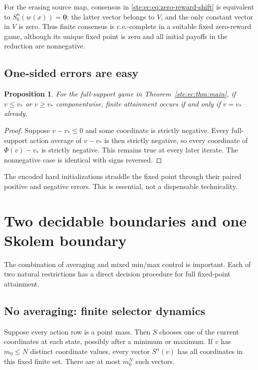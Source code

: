 \documentclass[11pt,letterpaper]{article}
\newtheorem{proposition}[theorem]{Proposition}
\theoremstyle{definition}
\theoremstyle{remark}
\newcommand{\zero}{\mathbf 0}
\begin{document}
For the erasing source map, consensus in
\eqref{ste:ec:eq:zero-reward-shift} is equivalent to
$S_0^n(w(x))=\zero$: the latter vector belongs to $V$, and the only
constant vector in $V$ is zero. Thus finite consensus is c.e.-complete in
a suitable fixed zero-reward game, although its unique fixed point is zero
and all initial payoffs in the reduction are nonnegative.

\subsection{One-sided errors are easy}

\begin{proposition}\label{ste:ec:prop:onesided}
For the full-support game in Theorem~\ref{ste:ec:thm:main}, if
$v\leq v_*$ or $v\geq v_*$ componentwise, finite attainment occurs if and
only if $v=v_*$ already.
\end{proposition}

\begin{proof}
Suppose $v-v_*\leq0$ and some coordinate is strictly negative.
Every full-support action average of $v-v_*$ is then strictly negative,
so every coordinate of $\Phi(v)-v_*$ is strictly negative. This remains
true at every later iterate. The nonnegative case is identical with
signs reversed.
\end{proof}

The encoded hard initializations straddle the fixed point through their
paired positive and negative errors. This is essential, not a dispensable
technicality.

\section{Two decidable boundaries and one Skolem boundary}
\label{ste:ec:sec:boundaries}

The combination of averaging and mixed min/max control is important. Each
of two natural restrictions has a direct decision procedure for full
fixed-point attainment.

\subsection{No averaging: finite selector dynamics}

Suppose every action row is a point mass. Then $S$ chooses one of the
current coordinates at each state, possibly after a minimum or maximum.
If $v$ has $m_0\leq N$ distinct coordinate values, every vector $S^n(v)$
has all coordinates in this fixed finite set. There are at most $m_0^N$
such vectors.
\end{document}
